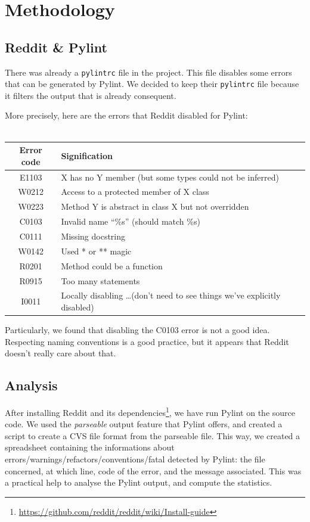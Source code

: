 \documentclass[11pt, a4paper]{article}
\newcommand{\tit}[1]{\textit{#1}}
\newcommand{\pyl}{\textsf{Pylint}}
\begin{document}
\section{Methodology}

\subsection*{Reddit \& \pyl{}}

There was already a \texttt{pylintrc} file in the project.
This file disables some errors that can be generated by \pyl{}.
We decided to keep their \texttt{pylintrc} file because it filters the output that is already consequent.

\smallskip
More precisely, here are the errors that Reddit disabled for \pyl{}: \\
\\
\begin{tabular}{|c|m{10cm}|}
\hline
\textbf{\small{Error code}} & \textbf{\small{Signification}} \\
\hline
\hline
E1103 	& X has no Y member (but some types could not be inferred) \\
\hline
W0212 	& Access to a protected member of X class \\
\hline
W0223	& Method Y is abstract in class X but not overridden \\
\hline
C0103	& Invalid name ``\%s'' (should match \%s) \\
\hline
C0111	& Missing docstring \\
\hline
W0142	& Used * or ** magic \\
\hline
R0201	& Method could be a function \\
\hline
R0915	& Too many statements \\
\hline
I0011	& Locally disabling \dots (don't need to see things we've explicitly disabled) \\
\hline
\end{tabular}

\medskip
Particularly, we found that disabling the C0103 error is not a good idea.
Respecting naming conventions is a good practice, but it appears that Reddit doesn't really care about that.


\bigskip
\subsection*{Analysis}
After installing Reddit and its dependencies\footnote{\url{https://github.com/reddit/reddit/wiki/Install-guide}}, we have run \pyl{} on the source code.
We used the \tit{parseable} output feature that \pyl{} offers, and created a script to create a CVS file format from the parseable file.
This way, we created a spreadsheet containing the informations about errors/warnings/refactors/conventions/fatal detected by \pyl{}: the file concerned, at which line, code of the error, and the message associated. This was a practical help to analyse the \pyl{} output, and compute the statistics.
\end{document}
